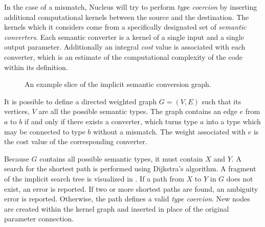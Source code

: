 In the case of a mismatch, Nucleus will try to perform \emph{type coercion} by inserting additional computational kernels between the source and the destination. The kernels which it considers come from a specifically designated set of \emph{semantic converters}. Each semantic converter is a kernel of a single input and a single output parameter. Additionally an integral \emph{cost} value is associated with each converter, which is an estimate of the computational complexity of the code within its definition.

\begin{figure}[ht!]
  \centering
    \caption[Implicit semantic search tree]{An example slice of the implicit semantic conversion graph.}
  \label{fig:SemanticSearchGraph}
\end{figure}

It is possible to define a directed weighted graph $G=(V, E)$ such that its vertices, $V$ are all the possible semantic types. The graph contains an edge $e$ from $a$ to $b$ if and only if there exists a converter, which turns type $a$ into a type which may be connected to type $b$ without a mismatch. The weight associated with $e$ is the cost value of the corresponding converter.

Because $G$ contains all possible semantic types, it must contain $X$ and $Y$. A search for the shortest path is performed using Dijkstra's algorithm. A fragment of the implicit search tree is visualized in . If a path from $X$ to $Y$ in $G$ does not exist, an error is reported. If two or more shortest paths are found, an ambiguity error is reported. Otherwise, the path defines a valid \emph{type coercion}. New nodes are created within the kernel graph and inserted in place of the original parameter connection.
	
